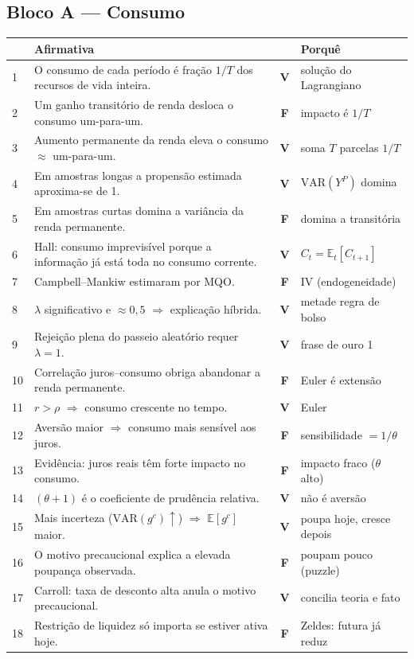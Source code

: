 \documentclass[12pt, a4paper]{article}
\newcommand{\E}{\mathbb{E}}
\newcommand{\VAR}{\mathrm{VAR}}
\newcommand{\Vok}{\textbf{\textcolor{greenbox}{V}}}
\newcommand{\Fno}{\textbf{\textcolor{redf}{F}}}
\begin{document}
\subsection*{Bloco A --- Consumo}
{\footnotesize
\renewcommand{\arraystretch}{1.3}
\begin{tabular}{p{0.5cm} p{9.2cm} c p{3.6cm}}
\toprule
& \textbf{Afirmativa} & & \textbf{Porquê} \\
\midrule
1 & O consumo de cada período é fração $1/T$ dos recursos de vida inteira. &
\Vok & solução do Lagrangiano \\
2 & Um ganho transitório de renda desloca o consumo um-para-um. &
\Fno & impacto é $1/T$ \\
3 & Aumento permanente da renda eleva o consumo $\approx$ um-para-um. &
\Vok & soma $T$ parcelas $1/T$ \\
4 & Em amostras longas a propensão estimada aproxima-se de 1. &
\Vok & $\VAR(Y^P)$ domina \\
5 & Em amostras curtas domina a variância da renda permanente. &
\Fno & domina a transitória \\
6 & Hall: consumo imprevisível porque a informação já está toda no consumo
corrente. & \Vok & $C_t = \E_t[C_{t+1}]$ \\
7 & Campbell--Mankiw estimaram por MQO. & \Fno & IV (endogeneidade) \\
8 & $\lambda$ significativo e $\approx 0{,}5$ $\Rightarrow$ explicação
híbrida. & \Vok & metade regra de bolso \\
9 & Rejeição plena do passeio aleatório requer $\lambda = 1$. &
\Vok & frase de ouro 1 \\
10 & Correlação juros--consumo obriga abandonar a renda permanente. &
\Fno & Euler é extensão \\
11 & $r > \rho$ $\Rightarrow$ consumo crescente no tempo. &
\Vok & Euler \\
12 & Aversão maior $\Rightarrow$ consumo mais sensível aos juros. &
\Fno & sensibilidade $= 1/\theta$ \\
13 & Evidência: juros reais têm forte impacto no consumo. &
\Fno & impacto fraco ($\theta$ alto) \\
14 & $(\theta + 1)$ é o coeficiente de prudência relativa. &
\Vok & não é aversão \\
15 & Mais incerteza ($\VAR(g^c)\uparrow$) $\Rightarrow$ $\E[g^c]$ maior. &
\Vok & poupa hoje, cresce depois \\
16 & O motivo precaucional explica a elevada poupança observada. &
\Fno & poupam pouco (puzzle) \\
17 & Carroll: taxa de desconto alta anula o motivo precaucional. &
\Vok & concilia teoria e fato \\
18 & Restrição de liquidez só importa se estiver ativa hoje. &
\Fno & Zeldes: futura já reduz \\
\bottomrule
\end{tabular}
}
\end{document}
